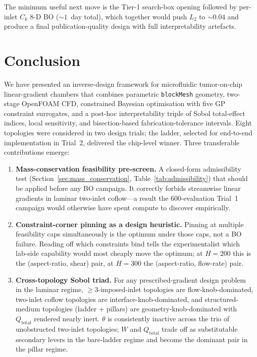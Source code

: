 \documentclass[12pt]{article}
\begin{document}
The minimum useful next move is the Tier-1 search-box opening followed by per-inlet $C_k$ 8-D BO ($\sim 1$~day total), which together would push $L_2$ to $\sim 0.04$ and produce a final publication-quality design with full interpretability artefacts.

\section{Conclusion}

We have presented an inverse-design framework for microfluidic tumor-on-chip linear-gradient chambers that combines parametric \texttt{blockMesh} geometry, two-stage OpenFOAM CFD, constrained Bayesian optimisation with five GP constraint surrogates, and a post-hoc interpretability triple of Sobol total-effect indices, local sensitivity, and bisection-based fabrication-tolerance intervals. Eight topologies were considered in two design trials; the ladder, selected for end-to-end implementation in Trial~2, delivered the chip-level winner. Three transferable contributions emerge:
\begin{enumerate}
\item \textbf{Mass-conservation feasibility pre-screen.} A closed-form admissibility test (Section~\ref{sec:mass_conservation}, Table~\ref{tab:admissibility}) that should be applied before any BO campaign. It correctly forbids streamwise linear gradients in laminar two-inlet coflow---a result the 600-evaluation Trial~1 campaign would otherwise have spent compute to discover empirically.
\item \textbf{Constraint-corner pinning as a design heuristic.} Pinning at multiple feasibility caps simultaneously is the optimum under those caps, not a BO failure. Reading off which constraints bind tells the experimentalist which lab-side capability would most cheaply move the optimum; at $H = 200$ this is the (aspect-ratio, shear) pair, at $H = 300$ the (aspect-ratio, flow-rate) pair.
\item \textbf{Cross-topology Sobol triad.} For any prescribed-gradient design problem in the laminar regime, $\geq\!3$-imposed-inlet topologies are flow-knob-dominated, two-inlet coflow topologies are interface-knob-dominated, and structured-medium topologies (ladder + pillars) are geometry-knob-dominated with $Q_{\text{total}}$ rendered nearly inert. $\theta$ is consistently inactive across the trio of unobstructed two-inlet topologies; $W$ and $Q_{\text{total}}$ trade off as substitutable secondary levers in the bare-ladder regime and become the dominant pair in the pillar regime.
\end{enumerate}
\end{document}
